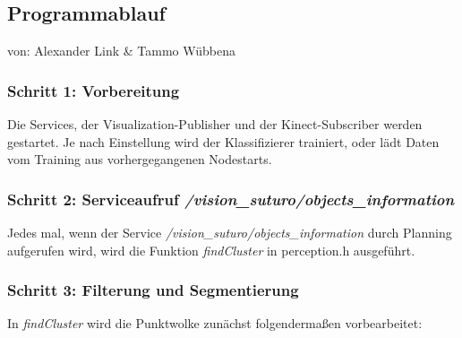 \documentclass{suturo}
\makeatletter
\newcommand{\chapterauthor}[1]{%
  {\parindent0pt\vspace*{-27pt}%
  \linespread{0}\small\begin{flushright}von: #1\end{flushright}%
  \par\nobreak\vspace*{0pt}}
  \@afterheading%
}
\makeatother
\begin{document}
\subsection{Programmablauf}
\chapterauthor{Alexander Link \& Tammo Wübbena}
\subsubsection{Schritt 1: Vorbereitung}
Die Services, der Visualization-Publisher und der Kinect-Subscriber werden gestartet. Je nach Einstellung wird der Klassifizierer trainiert, oder lädt Daten vom Training aus vorhergegangenen Nodestarts.

\begin{figure}[!htb]
\end{figure}

\subsubsection{Schritt 2: Serviceaufruf \textit{/vision\_suturo/objects\_information}}
Jedes mal, wenn der Service \textit{/vision\_suturo/objects\_information} durch Planning aufgerufen wird, wird die Funktion \textit{findCluster} in perception.h ausgeführt. 
\\
\subsubsection{Schritt 3: Filterung und Segmentierung} 
In \textit{findCluster} wird die Punktwolke zunächst folgendermaßen vorbearbeitet:
\end{document}
